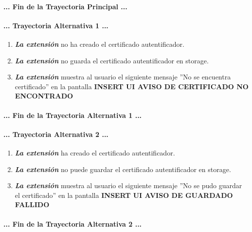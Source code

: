 \documentclass[12pt, a4paper, titlepage]{report}
\begin{document}
				\paragraph{... Fin de la Trayectoria Principal ...}
				
				\paragraph{... Trayectoria Alternativa 1 ...}
				\begin{enumerate}
				    \item \textbf{\textit{La extensión}} no ha creado el certificado autentificador.
					\item \textbf{\textit{La extensión}} no guarda el certificado autentificador en storage. 
					\item \textbf{\textit{La extensión}} muestra al usuario el siguiente mensaje ''No se encuentra certificado'' en la pantalla \textbf{INSERT UI AVISO DE CERTIFICADO NO ENCONTRADO}
				\end{enumerate}
				\paragraph{... Fin de la Trayectoria Alternativa 1 ...}
				
					\paragraph{... Trayectoria Alternativa 2 ...}
				\begin{enumerate}
				    \item \textbf{\textit{La extensión}} ha creado  el certificado autentificador.
					\item \textbf{\textit{La extensión}} no puede guardar el certificado autentificador en storage. 
					\item \textbf{\textit{La extensión}} muestra al usuario el siguiente mensaje ''No se pudo guardar el certificado'' en la pantalla \textbf{INSERT UI AVISO DE GUARDADO FALLIDO}
				\end{enumerate}
				\paragraph{... Fin de la Trayectoria Alternativa 2 ...}
				
				\newpage
			
\end{document}
